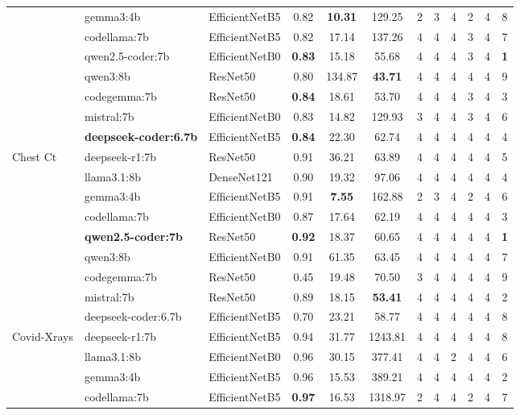 \documentclass{article}
\begin{document}
\begin{small}
\begin{tabularx}{\textwidth}{l l l c c c c c c c c c}
 & gemma3:4b & EfficientNetB5 & 0.82 & \textbf{10.31} & 129.25 & 2 & 3 & 4 & 2 & 4 & 8 \\
 & codellama:7b & EfficientNetB5 & 0.82 & 17.14 & 137.26 & 4 & 4 & 4 & 3 & 4 & 7 \\
 & qwen2.5-coder:7b & EfficientNetB0 & \textbf{0.83} & 15.18 & 55.68 & 4 & 4 & 4 & 3 & 4 & \textbf{1} \\
 & qwen3:8b & ResNet50 & 0.80 & 134.87 & \textbf{43.71} & 4 & 4 & 4 & 4 & 4 & 9 \\
 & codegemma:7b & ResNet50 & \textbf{0.84} & 18.61 & 53.70 & 4 & 4 & 4 & 3 & 4 & 3 \\
 & mistral:7b & EfficientNetB0 & 0.83 & 14.82 & 129.93 & 3 & 4 & 4 & 3 & 4 & 6 \\
 & \textbf{deepseek-coder:6.7b} & EfficientNetB5 & \textbf{0.84} & 22.30 & 62.74 & 4 & 4 & 4 & 4 & 4 & 4 \\
\midrule
\multirow{9}{*}{Chest Ct}
 & deepseek-r1:7b & ResNet50 & 0.91 & 36.21 & 63.89 & 4 & 4 & 4 & 4 & 4 & 5 \\
 & llama3.1:8b & DenseNet121 & 0.90 & 19.32 & 97.06 & 4 & 4 & 4 & 4 & 4 & 4 \\
 & gemma3:4b & EfficientNetB5 & 0.91 & \textbf{7.55} & 162.88 & 2 & 3 & 4 & 2 & 4 & 6 \\
 & codellama:7b & EfficientNetB0 & 0.87 & 17.64 & 62.19 & 4 & 4 & 4 & 4 & 4 & 3 \\
 & \textbf{qwen2.5-coder:7b} & ResNet50 & \textbf{0.92} & 18.37 & 60.65 & 4 & 4 & 4 & 4 & 4 & \textbf{1} \\
 & qwen3:8b & EfficientNetB0 & 0.91 & 61.35 & 63.45 & 4 & 4 & 4 & 4 & 4 & 7 \\
 & codegemma:7b & ResNet50 & 0.45 & 19.48 & 70.50 & 3 & 4 & 4 & 4 & 4 & 9 \\
 & mistral:7b & ResNet50 & 0.89 & 18.15 & \textbf{53.41} & 4 & 4 & 4 & 4 & 4 & 2 \\
 & deepseek-coder:6.7b & EfficientNetB5 & 0.70 & 23.21 & 58.77 & 4 & 4 & 4 & 4 & 4 & 8 \\
\midrule
\multirow{9}{*}{Covid-Xrays}
 & deepseek-r1:7b & EfficientNetB5 & 0.94 & 31.77 & 1243.81 & 4 & 4 & 4 & 4 & 4 & 8 \\
 & llama3.1:8b & EfficientNetB0 & 0.96 & 30.15 & 377.41 & 4 & 4 & 2 & 4 & 4 & 6 \\
 & gemma3:4b & EfficientNetB5 & 0.96 & 15.53 & 389.21 & 4 & 4 & 4 & 4 & 4 & 2 \\
 & codellama:7b & EfficientNetB5 & \textbf{0.97} & 16.53 & 1318.97 & 2 & 4 & 4 & 2 & 4 & 7 \\

\end{tabularx}
\end{small}
\end{document}

